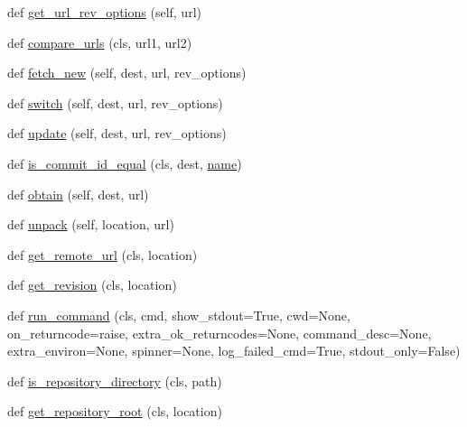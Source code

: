 \begin{DoxyCompactItemize}
def \hyperlink{classpip_1_1__internal_1_1vcs_1_1versioncontrol_1_1VersionControl_add1eb71a89bb58fae48a50f88ebec4e1}{get\+\_\+url\+\_\+rev\+\_\+options} (self, url)
\item 
def \hyperlink{classpip_1_1__internal_1_1vcs_1_1versioncontrol_1_1VersionControl_aad894f57f53bf430b8b10173dd2c7a1f}{compare\+\_\+urls} (cls, url1, url2)
\item 
def \hyperlink{classpip_1_1__internal_1_1vcs_1_1versioncontrol_1_1VersionControl_ac98b1ca87744257369447187b1c7b86d}{fetch\+\_\+new} (self, dest, url, rev\+\_\+options)
\item 
def \hyperlink{classpip_1_1__internal_1_1vcs_1_1versioncontrol_1_1VersionControl_a73943dd1e02547497c74aaf2d17c340e}{switch} (self, dest, url, rev\+\_\+options)
\item 
def \hyperlink{classpip_1_1__internal_1_1vcs_1_1versioncontrol_1_1VersionControl_a5c081d6a71565d9b4b090af740c4c597}{update} (self, dest, url, rev\+\_\+options)
\item 
def \hyperlink{classpip_1_1__internal_1_1vcs_1_1versioncontrol_1_1VersionControl_a0021850ef472815623c3fc54d1a5e8dd}{is\+\_\+commit\+\_\+id\+\_\+equal} (cls, dest, \hyperlink{classpip_1_1__internal_1_1vcs_1_1versioncontrol_1_1VersionControl_ad4d195fdcc6f01601aa267ae571b4732}{name})
\item 
def \hyperlink{classpip_1_1__internal_1_1vcs_1_1versioncontrol_1_1VersionControl_a6cd1dc22e3948b839e553cefb9e56c18}{obtain} (self, dest, url)
\item 
def \hyperlink{classpip_1_1__internal_1_1vcs_1_1versioncontrol_1_1VersionControl_aa999e293571b16d8a23255f9a7365f68}{unpack} (self, location, url)
\item 
def \hyperlink{classpip_1_1__internal_1_1vcs_1_1versioncontrol_1_1VersionControl_a04eb4fa27542d4b4216df78db6fb539c}{get\+\_\+remote\+\_\+url} (cls, location)
\item 
def \hyperlink{classpip_1_1__internal_1_1vcs_1_1versioncontrol_1_1VersionControl_aab649d220bff1dd8e589fdd211cddce9}{get\+\_\+revision} (cls, location)
\item 
def \hyperlink{classpip_1_1__internal_1_1vcs_1_1versioncontrol_1_1VersionControl_a0cd4df4ca2aaa3a020caf990e4142b91}{run\+\_\+command} (cls, cmd, show\+\_\+stdout=True, cwd=None, on\+\_\+returncode=\textquotesingle{}raise\textquotesingle{}, extra\+\_\+ok\+\_\+returncodes=None, command\+\_\+desc=None, extra\+\_\+environ=None, spinner=None, log\+\_\+failed\+\_\+cmd=True, stdout\+\_\+only=False)
\item 
def \hyperlink{classpip_1_1__internal_1_1vcs_1_1versioncontrol_1_1VersionControl_a90b73a5f179be0defd7bb75abdf38ad2}{is\+\_\+repository\+\_\+directory} (cls, path)
\item 
def \hyperlink{classpip_1_1__internal_1_1vcs_1_1versioncontrol_1_1VersionControl_a1bbbb1f6cf52525423e888fdd9adbfb6}{get\+\_\+repository\+\_\+root} (cls, location)
\end{DoxyCompactItemize}
